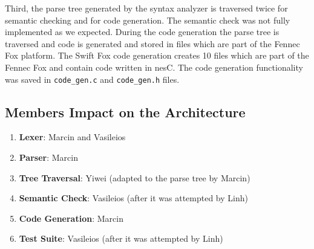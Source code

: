 Third, the parse tree generated by the syntax analyzer is traversed
twice for semantic checking and for code generation. The semantic check
was not fully implemented as we expected. During the code generation
the parse tree is traversed and code is generated and stored in files
which are part of the Fennec Fox platform. The Swift Fox code generation
creates 10 files which are part of the Fennec Fox and contain
code written in nesC. The code generation functionality was saved
in \texttt{code\_gen.c} and \texttt{code\_gen.h} files.

\subsection{Members Impact on the Architecture}

\begin{enumerate}

\item \textbf{Lexer}: Marcin and Vasileios
\item \textbf{Parser}: Marcin 
\item \textbf{Tree Traversal}: Yiwei (adapted to the parse tree by Marcin)
\item \textbf{Semantic Check}: Vasileios (after it was attempted by Linh)
\item \textbf{Code Generation}: Marcin
\item \textbf{Test Suite}: Vasileios (after it was attempted by Linh) 

\end{enumerate}
